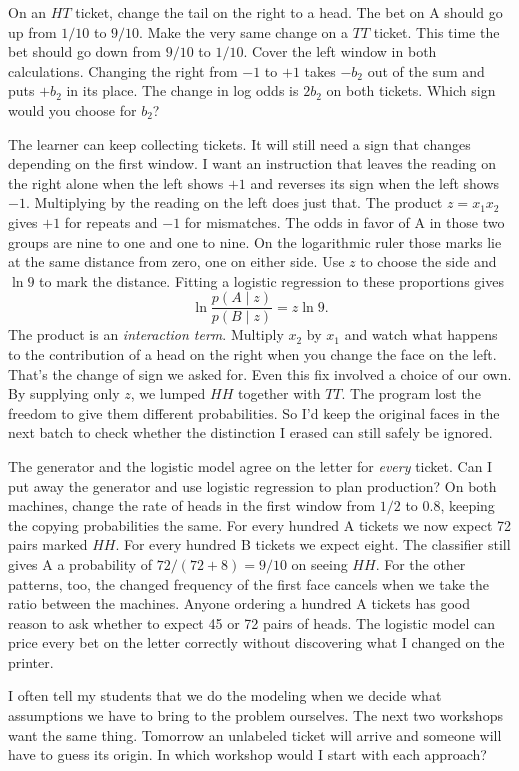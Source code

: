 On an $HT$ ticket, change the tail on the right to a head. The bet on A should go up from $1/10$ to $9/10$. Make the very same change on a $TT$ ticket. This time the bet should go down from $9/10$ to $1/10$. Cover the left window in both calculations. Changing the right from $-1$ to $+1$ takes $-b_2$ out of the sum and puts $+b_2$ in its place. The change in log odds is $2b_2$ on both tickets. Which sign would you choose for $b_2$?

The learner can keep collecting tickets. It will still need a sign that changes depending on the first window. I want an instruction that leaves the reading on the right alone when the left shows $+1$ and reverses its sign when the left shows $-1$. Multiplying by the reading on the left does just that. The product $z=x_1x_2$ gives $+1$ for repeats and $-1$ for mismatches. The odds in favor of A in those two groups are nine to one and one to nine. On the logarithmic ruler those marks lie at the same distance from zero, one on either side. Use $z$ to choose the side and $\ln 9$ to mark the distance. Fitting a logistic regression to these proportions gives
\[
              \ln\frac{p(A\mid z)}{p(B\mid z)}=z\ln 9 .
\]
The product is an \emph{interaction term}. Multiply $x_2$ by $x_1$ and watch what happens to the contribution of a head on the right when you change the face on the left. That's the change of sign we asked for. Even this fix involved a choice of our own. By supplying only $z$, we lumped $HH$ together with $TT$. The program lost the freedom to give them different probabilities. So I'd keep the original faces in the next batch to check whether the distinction I erased can still safely be ignored.

The generator and the logistic model agree on the letter for \emph{every} ticket. Can I put away the generator and use logistic regression to plan production? On both machines, change the rate of heads in the first window from $1/2$ to $0.8$, keeping the copying probabilities the same. For every hundred A tickets we now expect 72 pairs marked $HH$. For every hundred B tickets we expect eight. The classifier still gives A a probability of $72/(72+8)=9/10$ on seeing $HH$. For the other patterns, too, the changed frequency of the first face cancels when we take the ratio between the machines. Anyone ordering a hundred A tickets has good reason to ask whether to expect 45 or 72 pairs of heads. The logistic model can price every bet on the letter correctly without discovering what I changed on the printer.

I often tell my students that we do the modeling when we decide what assumptions we have to bring to the problem ourselves. The next two workshops want the same thing. Tomorrow an unlabeled ticket will arrive and someone will have to guess its origin. In which workshop would I start with each approach?

